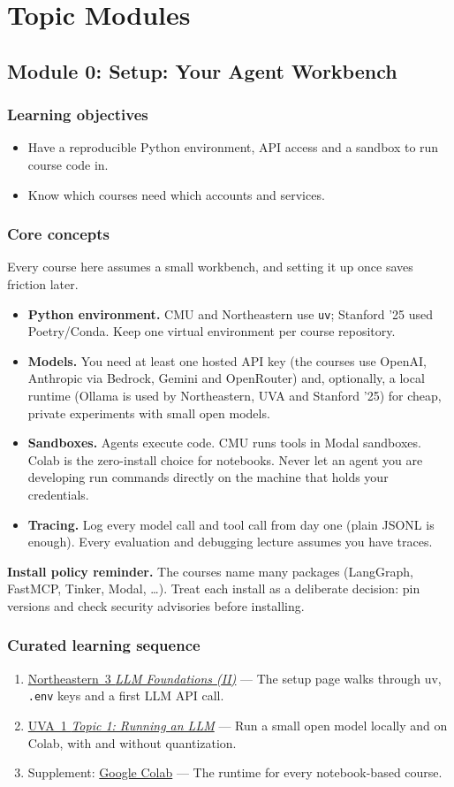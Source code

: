 \documentclass[10pt,oneside]{report}
\begin{document}
\part{Topic Modules}
\chapter{Module 0: Setup: Your Agent Workbench}\hypertarget{mod-SETUP}{}
\section{Learning objectives}
\begin{itemize}
\item Have a reproducible Python environment, API access and a sandbox to run course code in.
\item Know which courses need which accounts and services.
\end{itemize}
\section{Core concepts}
Every course here assumes a small workbench, and setting it up once saves friction later.
\begin{itemize}
\item \textbf{Python environment.} CMU and Northeastern use \texttt{uv}; Stanford '25 used Poetry/Conda. Keep one virtual environment per course repository.
\item \textbf{Models.} You need at least one hosted API key (the courses use OpenAI, Anthropic via Bedrock, Gemini and OpenRouter) and, optionally, a local runtime (Ollama is used by Northeastern, UVA and Stanford '25) for cheap, private experiments with small open models.
\item \textbf{Sandboxes.} Agents execute code. CMU runs tools in Modal sandboxes. Colab is the zero-install choice for notebooks. Never let an agent you are developing run commands directly on the machine that holds your credentials.
\item \textbf{Tracing.} Log every model call and tool call from day one (plain JSONL is enough). Every evaluation and debugging lecture assumes you have traces.
\end{itemize}
\textbf{Install policy reminder.} The courses name many packages (LangGraph, FastMCP, Tinker, Modal, \ldots). Treat each install as a deliberate decision: pin versions and check security advisories before installing.
\section{Curated learning sequence}
\begin{enumerate}
\item \hyperlink{lec-NEU-3}{Northeastern~3 \emph{LLM Foundations (II)}} --- The setup page walks through uv, \texttt{.env} keys and a first LLM API call.
\item \hyperlink{lec-UVA-1}{UVA~1 \emph{Topic 1: Running an LLM}} --- Run a small open model locally and on Colab, with and without quantization.
\item Supplement: \hyperref[sup-colab]{Google Colab} --- The runtime for every notebook-based course.
\end{enumerate}
\end{document}

